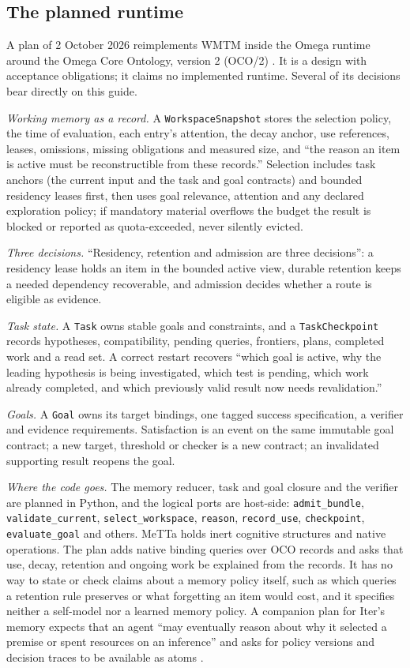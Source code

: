 \documentclass[11pt]{article}
\newcommand{\code}[1]{\texttt{#1}}
\theoremstyle{definition}
\theoremstyle{plain}
\begin{document}
\subsection{The planned runtime}\label{sec:oco2}

A plan of 2 October 2026 reimplements WMTM inside the Omega runtime around the Omega Core
Ontology, version 2 (OCO/2) \cite{oco2}. It is a design with acceptance obligations; it claims no
implemented runtime. Several of its decisions bear directly on this guide.

\emph{Working memory as a record.} A \code{WorkspaceSnapshot} stores the selection policy, the time
of evaluation, each entry's attention, the decay anchor, use references, leases, omissions,
missing obligations and measured size, and ``the reason an item is active must be reconstructible
from these records.'' Selection includes task anchors (the current input and the task and goal
contracts) and bounded residency leases first, then uses goal relevance, attention and any declared
exploration policy; if mandatory material overflows the budget the result is blocked
or reported as quota-exceeded, never silently evicted.

\emph{Three decisions.} ``Residency, retention and admission are three decisions'': a residency
lease holds an item in the bounded active view, durable retention keeps a needed dependency
recoverable, and admission decides whether a route is eligible as evidence.

\emph{Task state.} A \code{Task} owns stable goals and constraints, and a \code{TaskCheckpoint}
records hypotheses, compatibility, pending queries, frontiers, plans, completed work and a read
set. A correct restart recovers ``which goal is active, why the leading hypothesis is being
investigated, which test is pending, which work already completed, and which previously valid
result now needs revalidation.''

\emph{Goals.} A \code{Goal} owns its target bindings, one tagged success specification, a verifier
and evidence requirements. Satisfaction is an event on the same immutable goal contract; a new
target, threshold or checker is a new contract; an invalidated supporting result reopens the goal.

\emph{Where the code goes.} The memory reducer, task and goal closure and the verifier are planned
in Python, and the logical ports are host-side: \code{admit\_bundle}, \code{validate\_current},
\code{select\_workspace}, \code{reason}, \code{record\_use}, \code{checkpoint},
\code{evaluate\_goal} and others. MeTTa holds inert cognitive structures and native operations.
The plan adds native binding queries over OCO records and asks that use, decay, retention and
ongoing work be explained from the records. It has no way to state or check claims about a memory
policy itself, such as which queries a retention rule preserves or what forgetting an item would
cost, and it specifies neither a self-model nor a learned memory policy. A companion plan for Iter's memory expects that an agent ``may
eventually reason about why it selected a premise or spent resources on an inference'' and asks
for policy versions and decision traces to be available as atoms \cite{itermem}.
\end{document}
